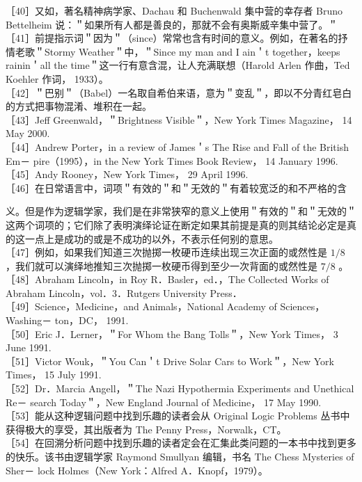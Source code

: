 ［40］又如，著名精神病学家、Dachau 和 Buchenwald 集中营的幸存者 Bruno Bettelheim 说：＂如果所有人都是善良的，那就不会有奥斯威辛集中营了。＂\\
［41］前提指示词＂因为＂（since）常常也含有时间的意义。例如，在著名的抒情老歌＂Stormy Weather＂中，＂Since my man and I ain＇t together，keeps rainin＇all the time＂这一行有意含混，让人充满联想（Harold Arlen 作曲，Ted Koehler 作词， 1933）。\\
［42］＂巴别＂（Babel）一名取自希伯来语，意为＂变乱＂，即以不分青红皂白的方式把事物混淆、堆积在一起。\\
［43］Jeff Greenwald，＂Brightness Visible＂，New York Times Magazine， 14 May 2000.\\
［44］Andrew Porter，in a review of James＇s The Rise and Fall of the British Em－ pire（1995），in the New York Times Book Review， 14 January 1996.\\
［45］Andy Rooney，New York Times， 29 April 1996.\\
［46］在日常语言中，词项＂有效的＂和＂无效的＂有着较宽泛的和不严格的含

义。但是作为逻辑学家，我们是在非常狭窄的意义上使用＂有效的＂和＂无效的＂这两个词项的；它们除了表明演绎论证在断定如果其前提是真的则其结论必定是真的这一点上是成功的或是不成功的以外，不表示任何别的意思。\\
［47］例如，如果我们知道三次抛掷一枚硬币连续出现三次正面的或然性是 $1 / 8$ ，我们就可以演绎地推知三次抛掷一枚硬币得到至少一次背面的或然性是 $7 / 8$ 。\\
［48］Abraham Lincoln，in Roy R．Basler，ed．，The Collected Works of Abraham Lincoln，vol．3．Rutgers University Press．\\
［49］Science，Medicine，and Animals，National Academy of Sciences，Washing－ ton，DC， 1991.\\
［50］Eric J．Lerner，＂For Whom the Bang Tolls＂，New York Times， 3 June 1991.\\
［51］Victor Wouk，＂You Can＇t Drive Solar Cars to Work＂，New York Times， 15 July 1991.\\
［52］Dr．Marcia Angell，＂The Nazi Hypothermia Experiments and Unethical Re－ search Today＂，New England Journal of Medicine， 17 May 1990.\\
［53］能从这种逻辑问题中找到乐趣的读者会从 Original Logic Problems 丛书中获得极大的享受，其出版者为 The Penny Press，Norwalk，CT。\\
［54］在回溯分析问题中找到乐趣的读者定会在汇集此类问题的一本书中找到更多的快乐。该书由逻辑学家 Raymond Smullyan 编辑，书名 The Chess Mysteries of Sher－ lock Holmes（New York：Alfred A．Knopf，1979）。